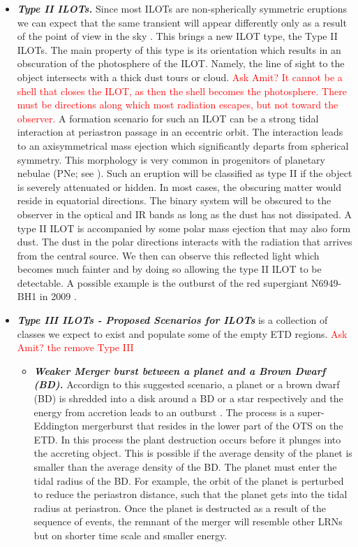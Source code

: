 \documentclass[a4paper,modern]{aastex62}
\newcommand{\tred}[1]{\textcolor{red}{#1}}
\newcommand{\emphbf}[1]{\textbf{\emph{#1}}}
\begin{document}
\begin{itemize}
\item \emphbf{Type II ILOTs.}  Since most ILOTs are non-spherically symmetric eruptions we can expect that the same transient will appear differently only as a result of the point of view in the sky \citep{2017MNRAS.467.3299K}. 
This brings a new ILOT type, the Type II ILOTs.
The main property of this type is its orientation which results in an obscuration of the photosphere of the ILOT.
Namely, the line of sight to the object intersects with a thick dust tours or cloud.
\tred{Ask Amit? It cannot be a shell that closes the ILOT, as then the shell becomes the photosphere. There must be directions along which most radiation escapes, but not toward the observer.}
A formation scenario for such an ILOT can be a strong tidal interaction at periastron passage in an eccentric orbit. 
The interaction leads to an axisymmetrical mass ejection which significantly departs from spherical symmetry.
This morphology is very common in progenitors of planetary nebulae (PNe; see \citealt{1987AJ.....94..671B,1995A&A...293..871C,1996iacm.book.....M,2011apn5.confP..21S,2016JPhCS.728c2008P}).
Such an eruption will be classified as type II if the object is severely attenuated or hidden.
In most cases, the obscuring matter would reside in equatorial directions. 
The binary system will be obscured to the observer in the optical and IR bands as long as the dust has not dissipated.
A type II ILOT is accompanied by some polar mass ejection that may also form dust.
The dust in the polar directions interacts with the radiation that arrives from the central source.
We then can observe this reflected light which becomes much fainter and by doing so allowing the type II ILOT to be detectable. 
A possible example is the outburst of the red supergiant N6949-BH1 in 2009 \citep{2017MNRAS.468.4968A}.

\item \emphbf{Type III ILOTs - Proposed Scenarios for ILOTs} is a collection of classes we expect to exist and populate some of the empty ETD regions.
\tred{Ask Amit? the remove Type III}
\begin{itemize} 
\item \emphbf{Weaker Merger burst between a planet and a Brown Dwarf (BD).} Accordign to this suggested scenario, a planet or a brown dwarf (BD) is shredded into a disk around a BD or a star respectively and the energy from accretion leads to an outburst \citep{2011MNRAS.416.1965B}. 
The process is a super-Eddington mergerburst that resides in the lower part of the OTS on the ETD.
In this process the plant destruction occurs before it plunges into the accreting object.
This is possible if the average density of the planet is smaller than the average density of the BD.
The planet must enter the tidal radius of the BD. 
For example, the orbit of the planet is perturbed to reduce the periastron distance, such that the planet gets into the tidal radius at periastron.
Once the planet is destructed as a result of the sequence of events, the remnant of the merger will resemble other LRNs but on shorter time scale and smaller energy.


\end{itemize}
\end{itemize}
\end{document}
